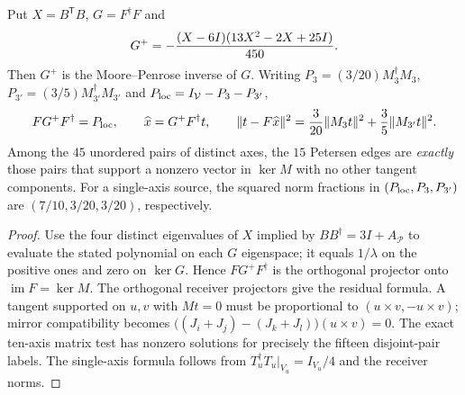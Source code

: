 \documentclass[11pt]{article}
\begin{document}
\begin{theorem}
\label{p1:thm:v371-petersen-source-reconstruction}
Put $X=B^{\mathsf T}B$, $G=F^\dagger F$ and
\[
 G^+=-{(X-6I)(13X^2-2X+25I)\over450}.
\]
Then $G^+$ is the Moore--Penrose inverse of $G$.
Writing $P_3=(3/20)M_3^\dagger M_3$,
$P_{3'}=(3/5)M_{3'}^\dagger M_{3'}$ and
$P_{\rm loc}=I_{\mathcal V}-P_3-P_{3'}$,
\[
 FG^+F^\dagger=P_{\rm loc},\qquad
 \widehat x=G^+F^\dagger t,\qquad
 \|t-F\widehat x\|^2=
 {3\over20}\|M_3t\|^2+{3\over5}\|M_{3'}t\|^2.
\]
Among the $45$ unordered pairs of distinct axes, the $15$ Petersen
edges are \emph{exactly} those pairs that support a nonzero vector in
$\ker M$ with no other tangent components. For a single-axis source,
the squared norm fractions in $(P_{\rm loc},P_3,P_{3'})$ are
$(7/10,3/20,3/20)$, respectively.
\end{theorem}
\begin{proof}
Use the four distinct eigenvalues of $X$ implied by
$BB^\dagger=3I+A_{\mathcal P}$ to evaluate the stated polynomial
on each $G$ eigenspace; it equals $1/\lambda$ on the positive
ones and zero on $\ker G$. Hence $FG^+F^\dagger$ is the orthogonal
projector onto $\operatorname{im}F=\ker M$. The orthogonal receiver
projectors give the residual formula. A tangent supported on $u,v$
with $Mt=0$ must be proportional to $(u\times v,-u\times v)$;
mirror compatibility becomes
$\bigl((J_i+J_j)-(J_k+J_l)\bigr)(u\times v)=0$.
The exact ten-axis matrix test has nonzero solutions for precisely the
fifteen disjoint-pair labels. The single-axis formula follows from
$T_u^\dagger T_u|_{V_u}=I_{V_u}/4$ and the receiver norms.
\end{proof}
\end{document}
